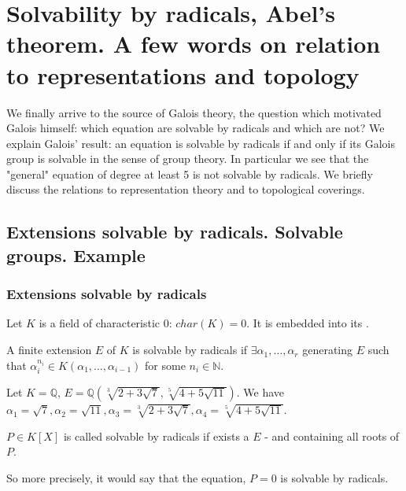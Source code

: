 \chapter{Solvability by radicals, Abel's theorem. A few words on
  relation to representations and topology}

We finally arrive to the source of Galois theory, the question which
motivated Galois himself: which equation are solvable by radicals and
which are not? We explain Galois' result: an equation is solvable by
radicals if and only if its Galois group is solvable in the sense of
group theory. In particular we see that the "general" equation of
degree at least 5 is not solvable by radicals. We briefly discuss the
relations to representation theory and to topological coverings.

\section{Extensions solvable by radicals. Solvable groups. Example} 

\subsection{Extensions solvable by radicals}

Let $K$ is a field of characteristic 0: $char(K) = 0$. It is embedded
into its .

\begin{definition}
  A finite extension $E$ of $K$ is solvable by radicals if
  $\exists \alpha_1, \dots, \alpha_r$ generating $E$ such that
  $\alpha_i^{n_i} \in K\left(\alpha_1, \dots, \alpha_{i-1}\right)$ for
  some $n_i \in \mathbb{N}$.
  \label{def:solvableextension}
\end{definition}

\begin{example}
  Let $K = \mathbb{Q}$, $E = \mathbb{Q}\left(\sqrt[3]{2 + 3
    \sqrt{7}}, \sqrt[5]{4 + 5 \sqrt{11}}\right)$. We have
    $\alpha_1 = \sqrt{7}, \alpha_2 = \sqrt{11},
    \alpha_3 = \sqrt[3]{2 + 3\sqrt{7}}, \alpha_4 = \sqrt[5]{4 + 5
      \sqrt{11}}$. 
\end{example}

\begin{definition}
  $P \in K\left[X\right]$ is called solvable by radicals if exists a
  $E$ -  and containing all roots of
  $P$. 
  \label{def:solvablepolynomial}
\end{definition}
So more precisely, it would say that the equation, $P = 0$ is solvable
by radicals.

